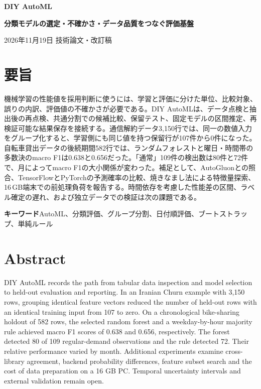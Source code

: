 \documentclass[11pt,a4paper]{article}
\newcommand{\project}{DIY AutoML}
\begin{document}
\begin{center}
{\LARGE\bfseries DIY AutoML\par}
\vspace{0.35em}
{\Large\bfseries 分類モデルの選定・不確かさ・データ品質をつなぐ評価基盤\par}
\vspace{0.85em}
{\small 2026年11月19日 \quad 技術論文・改訂稿\par}
\end{center}

\section*{要旨}
機械学習の性能値を採用判断に使うには、学習と評価に分けた単位、比較対象、誤りの内訳、評価値の不確かさが必要である。\project{}は、データ点検と抽出後の再点検、共通分割での候補比較、保留テスト、固定モデルの区間推定、再検証可能な結果保存を接続する。通信解約データ3,150行では、同一の数値入力をグループ化すると、学習側にも同じ値を持つ保留行が107件から0件になった。自転車貸出データの後続期間582行では、ランダムフォレストと曜日・時間帯の多数決のmacro F1は0.638と0.656だった。「通常」109件の検出数は80件と72件で、月によってmacro F1の大小関係が変わった。補足として、AutoGluonとの照合、TensorFlowとPyTorchの予測確率の比較、焼きなまし法による特徴量探索、16\,GB端末での前処理負荷を報告する。時間依存を考慮した性能差の区間、ラベル確定の遅れ、および独立データでの検証は次の課題である。

\noindent\textbf{キーワード}\quad AutoML、分類評価、グループ分割、日付順評価、ブートストラップ、単純ルール

\section*{Abstract}
DIY AutoML records the path from tabular data inspection and model selection to held-out evaluation and reporting. In an Iranian Churn example with 3,150 rows, grouping identical feature vectors reduced the number of held-out rows with an identical training input from 107 to zero. On a chronological bike-sharing holdout of 582 rows, the selected random forest and a weekday-by-hour majority rule achieved macro F1 scores of 0.638 and 0.656, respectively. The forest detected 80 of 109 regular-demand observations and the rule detected 72. Their relative performance varied by month. Additional experiments examine cross-library agreement, backend probability differences, feature subset search and the cost of data preparation on a 16 GB PC. Temporal uncertainty intervals and external validation remain open.






\clearpage
\appendix


\end{document}
